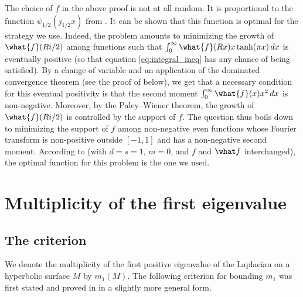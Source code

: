 \documentclass[12pt]{amsart}
\numberwithin{equation}{section}
\begin{document}
\begin{rem}
The choice of $f$ in the above proof is not at all random. It is proportional to the function $\psi_{1/2}(j_{1/2} x)$ from . It can be shown that this function is optimal for the strategy we use. Indeed, the problem amounts to minimizing the growth of $\what{f}(Ri/2)$ among functions such that $\int_0^\infty \what{f}(Rx)x \tanh(\pi x) \,dx$ is eventually positive (so that equation \eqref{eq:integral_ineq} has any chance of being satisfied). By a change of variable and an application of the dominated convergence theorem (see the proof of  below), we get that a necessary condition for this eventual positivity is that the second moment $\int_0^\infty \what{f}(x) x^2 \,dx$ is non-negative. Moreover, by the Paley--Wiener theorem, the growth of $\what{f}(Ri/2)$ is controlled by the support of $f$. The question thus boils down to minimizing the support of $f$ among non-negative even functions whose Fourier transform is non-positive outside $[-1,1]$ and has a non-negative second moment. According to \cite[Remark 1.2]{Gorbachev} (with $d=s=1$, $m=0$, and $f$ and $\what f$ interchanged), the optimal function for this problem is the one we used. 
\end{rem}


\section{Multiplicity of the first eigenvalue}


\subsection{The criterion}
We denote the multiplicity of the first positive eigenvalue of the Laplacian on a hyperbolic surface $M$ by $m_1(M)$. The following criterion for bounding $m_1$ was first stated and proved in \cite[Lemma 3.2]{Klein} in  a slightly more general form.
\end{document}
